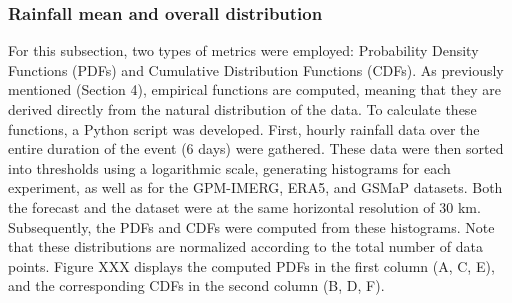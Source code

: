 \subsubsection{Rainfall mean and overall distribution}

For this subsection, two types of metrics were employed: Probability Density Functions (PDFs) and Cumulative Distribution Functions (CDFs). As previously mentioned (Section 4), empirical functions are computed, meaning that they are derived directly from the natural distribution of the data. To calculate these functions, a Python script was developed. First, hourly rainfall data over the entire duration of the event (6 days) were gathered. These data were then sorted into thresholds using a logarithmic scale, generating histograms for each experiment, as well as for the GPM-IMERG, ERA5, and GSMaP datasets. Both the forecast and the dataset were at the same horizontal resolution of 30 km. Subsequently, the PDFs and CDFs were computed from these histograms. Note that these distributions are normalized according to the total number of data points. Figure XXX displays the computed PDFs in the first column (A, C, E), and the corresponding CDFs in the second column (B, D, F).


